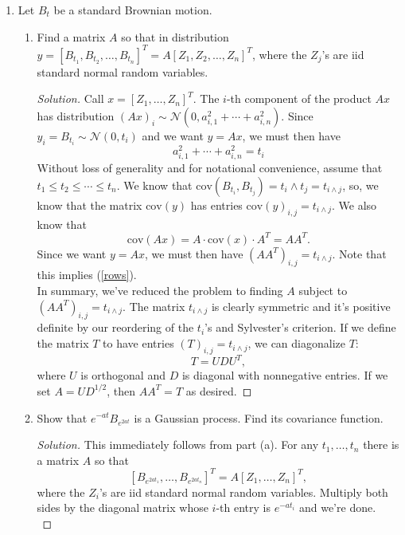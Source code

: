 \documentclass[11pt,letterpaper]{report}
\newcommand{\mcal}[1]{\mathcal{#1}}
\newcommand{\cov}{\text{cov}}
\newenvironment{solution}
{\begin{proof}[Solution]}
{\end{proof}}
\begin{document}
\begin{enumerate}
	\item Let $B_t$ be a standard Brownian motion.
	\begin{enumerate}
		\item Find a matrix $A$ so that in distribution $y = [B_{t_1}, B_{t_2}, \ldots, B_{t_n}]^T = A[Z_1, Z_2, \ldots, Z_n]^T$, where the $Z_j$'s are iid standard normal random variables.
		\begin{solution}
			Call $x = [Z_1, \ldots, Z_n]^T$. The $i$-th component of the product $Ax$ has distribution $(Ax)_i\sim \mcal{N}(0, a_{i,1}^2 + \cdots + a_{i,n}^2)$. Since $y_i = B_{t_i}\sim \mcal{N}(0, t_i)$ and we want $y = Ax$, we must then have
			\begin{equation}\label{rows}
				a_{i,1}^2 + \cdots + a_{i,n}^2 = t_i
			\end{equation}
			Without loss of generality and for notational convenience, assume that $t_1\leq t_2\leq \cdots \leq t_n$. We know that $\cov(B_{t_i}, B_{t_j}) = t_i\land t_j = t_{i\land j}$, so, we know that the matrix $\cov(y)$ has entries $\cov(y)_{i,j} = t_{i\land j}$. We also know that
			\[
			\cov(Ax) = A\cdot \cov(x)\cdot A^T = AA^T.
			\]
			Since we want $y = Ax$, we must then have $(AA^T)_{i,j} = t_{i\land j}$. Note that this implies (\ref{rows}).\\

			\noindent In summary, we've reduced the problem to finding $A$ subject to $(AA^T)_{i,j} = t_{i\land j}$. The matrix $t_{i\land j}$ is clearly symmetric and it's positive definite by our reordering of the $t_i$'s and Sylvester's criterion. If we define the matrix $T$ to have entries $(T)_{i,j} = t_{i\land j}$, we can diagonalize $T$:
			\[
				T = UDU^T,
			\]
			where $U$ is orthogonal and $D$ is diagonal with nonnegative entries. If we set $A = UD^{1/2}$, then $AA^T = T$ as desired.
		\end{solution}

		\item Show that $e^{-at}B_{e^{2at}}$ is a Gaussian process. Find its covariance function.
		\begin{solution}
			This immediately follows from part (a). For any $t_1, \ldots, t_n$ there is a matrix $A$ so that
			\[
			[B_{e^{2at_1}}, \ldots, B_{e^{2at_n}}]^T = A[Z_1, \ldots, Z_n]^T,
			\]
			where the $Z_i$'s are iid standard normal random variables. Multiply both sides by the diagonal matrix whose $i$-th entry is $e^{-at_i}$ and we're done.\\


\end{solution}
\end{enumerate}
\end{enumerate}
\end{document}

